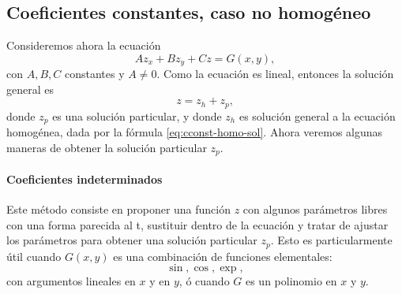 \documentclass[11pt,letterpaper,draft]{report}
\theoremstyle{plain}
\theoremstyle{definition}
\theoremstyle{remark}
\newcommand\<{\langle}
\renewcommand\>{\rangle}
\begin{document}
\subsection{Coeficientes constantes, caso no homogéneo}
\label{ssec:cconst-nohomo}

Consideremos ahora la ecuación
\begin{equation}
  \label{eq:cconst}
  A z_x + B z_y + C z = G(x,y),
\end{equation}
con \(A,B,C\) constantes y \(A\neq 0\).
Como la ecuación es lineal, entonces la solución general es
\begin{equation}
  z = z_h + z_p
,\end{equation}
donde \(z_p\) es una solución particular, y donde \(z_h\) es solución
general a la ecuación homogénea, dada por la fórmula
\eqref{eq:cconst-homo-sol}.
Ahora veremos algunas maneras de obtener la solución particular 
\(z_p\).

\paragraph{Coeficientes indeterminados}
Este método consiste en proponer una función \(z\) con algunos
parámetros libres con una forma parecida al t, sustituir dentro de la
ecuación y tratar de ajustar los parámetros para obtener una solución
particular \(z_p\).
Esto es particularmente útil cuando $G(x,y)$ es una combinación de
funciones elementales:
\[
  \sin, \cos, \exp,
\]
con argumentos lineales en $x$ y en $y$, ó cuando $G$ es
un polinomio en $x$ y $y$.
\end{document}
